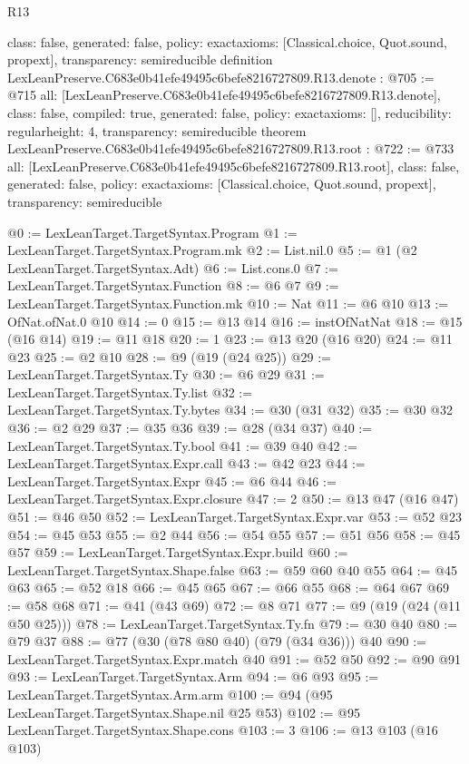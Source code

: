 \begin{lexlean}{R13}
\begin{coremodule}
{  class: false,
  generated: false,
  policy: exact{axioms: [Classical.choice, Quot.sound, propext]},
  transparency: semireducible
}
definition LexLeanPreserve.C683e0b41efe49495c6befe8216727809.R13.denote : @705 := @715 {
  all: [LexLeanPreserve.C683e0b41efe49495c6befe8216727809.R13.denote],
  class: false,
  compiled: true,
  generated: false,
  policy: exact{axioms: []},
  reducibility: regular{height: 4},
  transparency: semireducible
}
theorem LexLeanPreserve.C683e0b41efe49495c6befe8216727809.R13.root : @722 := @733 {
  all: [LexLeanPreserve.C683e0b41efe49495c6befe8216727809.R13.root],
  class: false,
  generated: false,
  policy: exact{axioms: [Classical.choice, Quot.sound, propext]},
  transparency: semireducible
}

@0 := LexLeanTarget.TargetSyntax.Program
@1 := LexLeanTarget.TargetSyntax.Program.mk
@2 := List.nil.{0}
@5 := @1 (@2 LexLeanTarget.TargetSyntax.Adt)
@6 := List.cons.{0}
@7 := LexLeanTarget.TargetSyntax.Function
@8 := @6 @7
@9 := LexLeanTarget.TargetSyntax.Function.mk
@10 := Nat
@11 := @6 @10
@13 := OfNat.ofNat.{0} @10
@14 := 0
@15 := @13 @14
@16 := instOfNatNat
@18 := @15 (@16 @14)
@19 := @11 @18
@20 := 1
@23 := @13 @20 (@16 @20)
@24 := @11 @23
@25 := @2 @10
@28 := @9 (@19 (@24 @25))
@29 := LexLeanTarget.TargetSyntax.Ty
@30 := @6 @29
@31 := LexLeanTarget.TargetSyntax.Ty.list
@32 := LexLeanTarget.TargetSyntax.Ty.bytes
@34 := @30 (@31 @32)
@35 := @30 @32
@36 := @2 @29
@37 := @35 @36
@39 := @28 (@34 @37)
@40 := LexLeanTarget.TargetSyntax.Ty.bool
@41 := @39 @40
@42 := LexLeanTarget.TargetSyntax.Expr.call
@43 := @42 @23
@44 := LexLeanTarget.TargetSyntax.Expr
@45 := @6 @44
@46 := LexLeanTarget.TargetSyntax.Expr.closure
@47 := 2
@50 := @13 @47 (@16 @47)
@51 := @46 @50
@52 := LexLeanTarget.TargetSyntax.Expr.var
@53 := @52 @23
@54 := @45 @53
@55 := @2 @44
@56 := @54 @55
@57 := @51 @56
@58 := @45 @57
@59 := LexLeanTarget.TargetSyntax.Expr.build
@60 := LexLeanTarget.TargetSyntax.Shape.false
@63 := @59 @60 @40 @55
@64 := @45 @63
@65 := @52 @18
@66 := @45 @65
@67 := @66 @55
@68 := @64 @67
@69 := @58 @68
@71 := @41 (@43 @69)
@72 := @8 @71
@77 := @9 (@19 (@24 (@11 @50 @25)))
@78 := LexLeanTarget.TargetSyntax.Ty.fn
@79 := @30 @40
@80 := @79 @37
@88 := @77 (@30 (@78 @80 @40) (@79 (@34 @36))) @40
@90 := LexLeanTarget.TargetSyntax.Expr.match @40
@91 := @52 @50
@92 := @90 @91
@93 := LexLeanTarget.TargetSyntax.Arm
@94 := @6 @93
@95 := LexLeanTarget.TargetSyntax.Arm.arm
@100 := @94 (@95 LexLeanTarget.TargetSyntax.Shape.nil @25 @53)
@102 := @95 LexLeanTarget.TargetSyntax.Shape.cons
@103 := 3
@106 := @13 @103 (@16 @103)

\end{coremodule}
\end{lexlean}
